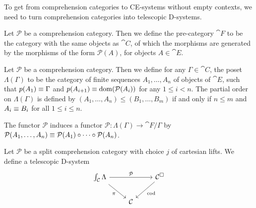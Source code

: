 To get from comprehension categories to CE-systems without empty contexts, we
need to turn comprehension categories into telescopic D-systems. 

\begin{defn}
Let $\mathcal{P}$ be a comprehension category. Then we define the pre-category
$\cat{F}$ to be the category with the same objects as $\cat{C}$, of which the
morphisms are generated by the morphisms of the form $\mathcal{P}(A)$, for objects
$A\in\cat{E}$. 
\end{defn}

\begin{defn}
Let $\mathcal{P}$ be a comprehension category. Then we define for any 
$\Gamma\in\cat{C}$, the poset $\Lambda(\Gamma)$ to be the category of finite 
sequences  $A_1,\ldots,A_n$ of objects of $\cat{E}$, such that 
$p(A_1)\equiv\Gamma$ and $p(A_{i+1})\equiv\mathrm{dom}(\mathcal{P}(A_i))$ 
for any $1\leq i < n$. The partial order on 
$\Lambda(\Gamma)$ is defined by $(A_1,\ldots,A_n)\leq (B_1,\ldots,B_m)$ if and 
only if $n\leq m$ and $A_i\equiv B_i$ for all $1\leq i\leq n$.

The functor $\mathcal{P}$ induces a functor $\mathcal{P}:\Lambda(\Gamma)\to
\cat{F}/\Gamma$ by $\mathcal{P}(A_1,\ldots,A_n)\equiv\mathcal{P}(A_1)\circ
\cdots\circ\mathcal{P}(A_n)$.
\end{defn}

\begin{defn}\label{defn:comp_to_telescopic}
Let $\mathcal{P}$ be a split comprehension category with choice $j$ of cartesian
lifts. We define a telescopic D-system
\begin{equation*}
\begin{tikzcd}
\int_{\cat{C}}\Lambda \arrow[rr,"\bar{\mathcal{P}}"] \arrow[dr,swap,"\pi"] & &
\cat{C}^\square \arrow[dl,"\mathrm{cod}"] \\ & \cat{C}
\end{tikzcd}
\end{equation*}
\end{defn}

